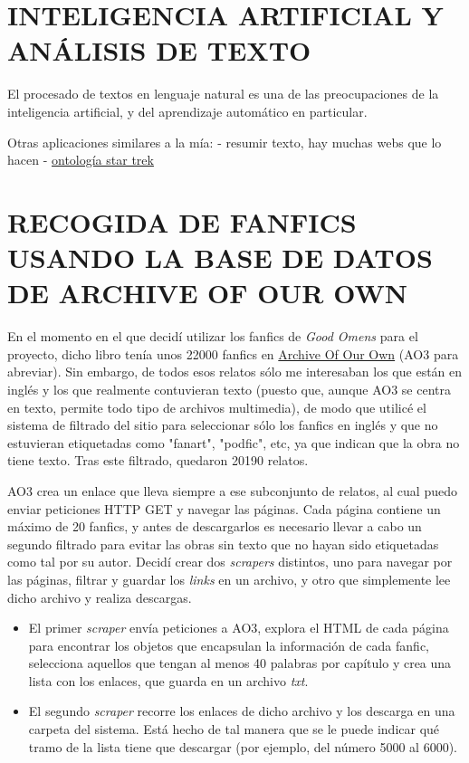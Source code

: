 \documentclass{pre-tfg}
\begin{document}
\section{INTELIGENCIA ARTIFICIAL Y ANÁLISIS DE TEXTO}

El procesado de textos en lenguaje natural es una de las preocupaciones de la inteligencia artificial, y del aprendizaje automático en particular. 

Otras aplicaciones similares a la mía:
- resumir texto, hay muchas webs que lo hacen
- \href{https://pr-owl.org/basics/ontostartrek.php}{ontología star trek}




\section{RECOGIDA DE FANFICS USANDO LA BASE DE DATOS DE ARCHIVE OF OUR OWN}
\label{sec:recogidadatos}

En el momento en el que decidí utilizar los fanfics de \textit{Good Omens} para el proyecto, dicho libro tenía unos 22000 fanfics en \href{archiveofourown.org}{Archive Of Our Own} (AO3 para abreviar). Sin embargo, de todos esos relatos sólo me interesaban los que están en inglés y los que realmente contuvieran texto (puesto que, aunque AO3 se centra en texto, permite todo tipo de archivos multimedia), de modo que utilicé el sistema de filtrado del sitio para seleccionar sólo los fanfics en inglés y que no estuvieran etiquetadas como "fanart", "podfic", etc, ya que indican que la obra no tiene texto. Tras este filtrado, quedaron 20190 relatos.

AO3 crea un enlace que lleva siempre a ese subconjunto de relatos, al cual puedo enviar peticiones HTTP GET y navegar las páginas. Cada página contiene un máximo de 20 fanfics, y antes de descargarlos es necesario llevar a cabo un segundo filtrado para evitar las obras sin texto que no hayan sido etiquetadas como tal por su autor. Decidí crear dos \textit{scrapers} distintos, uno para navegar por las páginas, filtrar y guardar los \textit{links} en un archivo, y otro que simplemente lee dicho archivo y realiza descargas.

\begin{itemize}
	\item El primer \textit{scraper} envía peticiones a AO3, explora el HTML de cada página para encontrar los objetos que encapsulan la información de cada fanfic, selecciona aquellos que tengan al menos 40 palabras por capítulo y crea una lista con los enlaces, que guarda en un archivo \textit{txt}.
	\item El segundo \textit{scraper} recorre los enlaces de dicho archivo y los descarga en una carpeta del sistema. Está hecho de tal manera que se le puede indicar qué tramo de la lista tiene que descargar (por ejemplo, del número 5000 al 6000).
	
\end{itemize}
\end{document}
